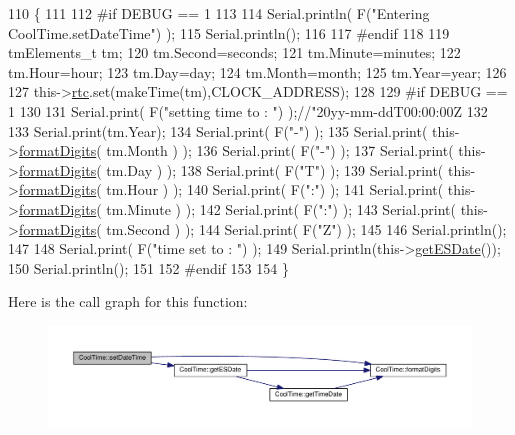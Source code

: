 \begin{DoxyCode}
110 \{ 
111 
112 \textcolor{preprocessor}{#if DEBUG == 1}
113 
114     Serial.println( F(\textcolor{stringliteral}{"Entering CoolTime.setDateTime"}) );
115     Serial.println();
116 
117 \textcolor{preprocessor}{#endif}
118 
119     tmElements\_t tm;
120     tm.Second=seconds; 
121     tm.Minute=minutes; 
122     tm.Hour=hour; 
123     tm.Day=day;
124     tm.Month=month; 
125     tm.Year=year;
126     
127     this->\hyperlink{class_cool_time_abd38f2384ff90692b1568d9db869412e}{rtc}.set(makeTime(tm),CLOCK\_ADDRESS);   
128 
129 \textcolor{preprocessor}{#if DEBUG == 1}
130 
131     Serial.print( F(\textcolor{stringliteral}{"setting time to : "}) );\textcolor{comment}{//"20yy-mm-ddT00:00:00Z}
132 
133     Serial.print(tm.Year);
134     Serial.print( F(\textcolor{stringliteral}{"-"}) );
135     Serial.print( this->\hyperlink{class_cool_time_acd537cd4210d7bde4e1f5c47d2ac0456}{formatDigits}( tm.Month ) );
136     Serial.print( F(\textcolor{stringliteral}{"-"}) );
137     Serial.print( this->\hyperlink{class_cool_time_acd537cd4210d7bde4e1f5c47d2ac0456}{formatDigits}( tm.Day ) );
138     Serial.print( F(\textcolor{stringliteral}{"T"}) );
139     Serial.print( this->\hyperlink{class_cool_time_acd537cd4210d7bde4e1f5c47d2ac0456}{formatDigits}( tm.Hour ) );
140     Serial.print( F(\textcolor{stringliteral}{":"}) );
141     Serial.print( this->\hyperlink{class_cool_time_acd537cd4210d7bde4e1f5c47d2ac0456}{formatDigits}( tm.Minute ) );
142     Serial.print( F(\textcolor{stringliteral}{":"}) );
143     Serial.print( this->\hyperlink{class_cool_time_acd537cd4210d7bde4e1f5c47d2ac0456}{formatDigits}( tm.Second ) );
144     Serial.print( F(\textcolor{stringliteral}{"Z"}) );
145 
146     Serial.println();
147     
148     Serial.print( F(\textcolor{stringliteral}{"time set to : "}) );
149     Serial.println(this->\hyperlink{class_cool_time_ac4f32ee513c1328d984306645e8785a4}{getESDate}());
150     Serial.println();
151 
152 \textcolor{preprocessor}{#endif}
153 
154 \}
\end{DoxyCode}
Here is the call graph for this function\+:\nopagebreak
\begin{figure}[H]
\begin{center}
\leavevmode
\includegraphics[width=350pt]{d6/d49/class_cool_time_ab81ea7fdaace111aa01cc1ec84c6d297_cgraph}
\end{center}
\end{figure}
\mbox{\label{class_cool_time_aae601f795452cfa48d9fb337aed483a8}} 
